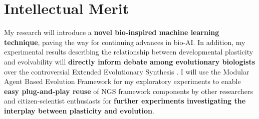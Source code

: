 \section{Intellectual Merit}
My research will introduce a \textbf{novel bio-inspired machine learning technique}, paving the way for continuing advances in bio-AI.
In addition, my experimental results describing the relationship between developmental plasticity and evolvability will \textbf{directly inform debate among evolutionary biologists} over the controversial Extended Evolutionary Synthesis \cite{Laland2014DoesRethink}.
I will use the Modular Agent Based Evolution Framework \cite{Hintze2017Mabe} for my exploratory experiments to enable \textbf{easy plug-and-play reuse} of NGS framework components by other researchers and citizen-scientist enthusiasts for \textbf{further experiments investigating the interplay between plasticity and evolution}.
